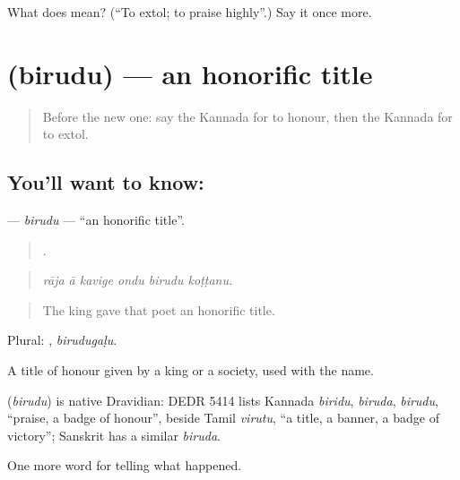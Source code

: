 \begin{tcolorbox}[breakable,colback=teal!4,colframe=teal!35!black,title={Before you move on}]
What does  mean? (\textquotedblleft{}To extol; to praise highly\textquotedblright{}.) Say it once more.
\end{tcolorbox}
\section[\texorpdfstring{\kn{ಬಿರುದು} (birudu)}{ಬಿರುದು (birudu)}]{ (birudu) — an honorific title}

\label{lesson:KA-C350-birudu}



\begin{quote}
Before the new one: say the Kannada for to honour, then the Kannada for to extol.
\end{quote}

\subsection*{You'll want to know: }
\textbf{} — \emph{birudu} — \textquotedblleft{}an honorific title\textquotedblright{}.

\begin{quote}
     .
\end{quote}

\begin{quote}
\emph{rāja ā kavige ondu birudu koṭṭanu.}
\end{quote}

\begin{quote}
The king gave that poet an honorific title.
\end{quote}

Plural: , \emph{birudugaḷu}.

A title of honour given by a king or a society, used with the name.

\begin{cousinweb}
\textbf{} (\emph{birudu}) is native Dravidian: DEDR 5414 lists Kannada \emph{biridu}, \emph{biruda}, \emph{birudu}, \textquotedblleft{}praise, a badge of honour\textquotedblright{}, beside Tamil \emph{virutu}, \textquotedblleft{}a title, a banner, a badge of victory\textquotedblright{}; Sanskrit has a similar \emph{biruda}.
\end{cousinweb}

\begin{grammarlens}[title={What you've built}]
One more word for telling what happened.
\end{grammarlens}

